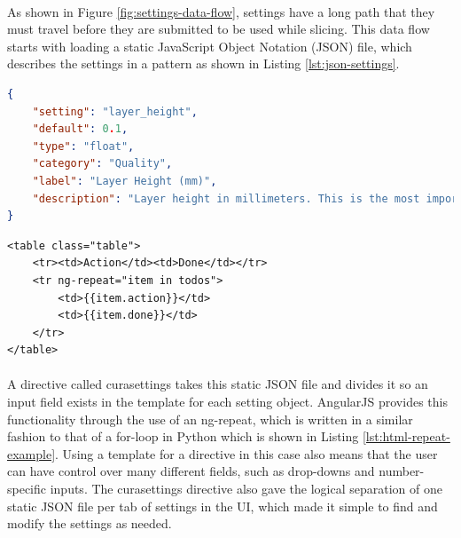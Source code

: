 \paragraph{}
As shown in Figure \ref{fig:settings-data-flow}, settings have a long path that they must travel before they are submitted to be used while slicing. 
This data flow starts with loading a static JavaScript Object Notation (JSON) file, which describes the settings in a pattern as shown in Listing \ref{lst:json-settings}.

\begin{lstlisting}[language=json, label={lst:json-settings}, caption=A sample from a static settings file in JSON format.]
{
    "setting": "layer_height",
    "default": 0.1,
    "type": "float",
    "category": "Quality",
    "label": "Layer Height (mm)",
    "description": "Layer height in millimeters. This is the most important setting to determine the quality of your print. Normal quality prints are 0.1mm, high quality is 0.06mm. You can go up to 0.25mm."
}
\end{lstlisting}

\begin{lstlisting}[language=HTML5, label={lst:html-repeat-example}, caption=An example of a ng-repeat looping construct in HTML5.]
<table class="table">
	<tr><td>Action</td><td>Done</td></tr>
	<tr ng-repeat="item in todos">
		<td>{{item.action}}</td>
		<td>{{item.done}}</td>
	</tr>
</table>
\end{lstlisting}

\paragraph{}
A directive called curasettings takes this static JSON file and divides it so an input field exists in the template for each setting object.
AngularJS provides this functionality through the use of an ng-repeat, which is written in a similar fashion to that of a for-loop in Python which is shown in Listing \ref{lst:html-repeat-example}.
Using a template for a directive in this case also means that the user can have control over many different fields, such as drop-downs and number-specific inputs.
The curasettings directive also gave the logical separation of one static JSON file per tab of settings in the UI, which made it simple to find and modify the settings as needed.

